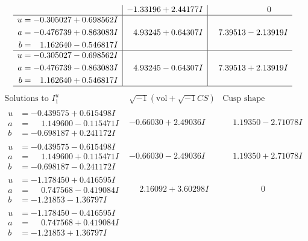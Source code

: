 \documentclass[1p]{elsarticle_modified}
\theoremstyle{definition}
\newcommand{\I}{\sqrt{-1}}
\begin{document}
$$\begin{array}{c|c|c}
 & -1.33196 + 2.44177 I & \phantom{-0.000000 } 0 \\ \hline\begin{aligned}
u &= -0.305027 + 0.698562 I \\
a &= -0.476739 + 0.863083 I \\
b &= \phantom{-}1.162640 - 0.546817 I\end{aligned}
 & \phantom{-}4.93245 + 0.64307 I & \phantom{-}7.39513 - 2.13919 I \\ \hline\begin{aligned}
u &= -0.305027 - 0.698562 I \\
a &= -0.476739 - 0.863083 I \\
b &= \phantom{-}1.162640 + 0.546817 I\end{aligned}
 & \phantom{-}4.93245 - 0.64307 I & \phantom{-}7.39513 + 2.13919 I\\
 \hline 
 \end{array}$$\newpage$$\begin{array}{c|c|c}  
\text{Solutions to }I^u_{1}& \I (\text{vol} + \sqrt{-1}CS) & \text{Cusp shape}\\
 \hline 
\begin{aligned}
u &= -0.439575 + 0.615498 I \\
a &= \phantom{-}1.149600 - 0.115471 I \\
b &= -0.698187 + 0.241172 I\end{aligned}
 & -0.66030 + 2.49036 I & \phantom{-}1.19350 - 2.71078 I \\ \hline\begin{aligned}
u &= -0.439575 - 0.615498 I \\
a &= \phantom{-}1.149600 + 0.115471 I \\
b &= -0.698187 - 0.241172 I\end{aligned}
 & -0.66030 - 2.49036 I & \phantom{-}1.19350 + 2.71078 I \\ \hline\begin{aligned}
u &= -1.178450 + 0.416595 I \\
a &= \phantom{-}0.747568 - 0.419084 I \\
b &= -1.21853 - 1.36797 I\end{aligned}
 & \phantom{-}2.16092 + 3.60298 I & \phantom{-0.000000 } 0 \\ \hline\begin{aligned}
u &= -1.178450 - 0.416595 I \\
a &= \phantom{-}0.747568 + 0.419084 I \\
b &= -1.21853 + 1.36797 I\end{aligned}

\end{array}$$
\end{document}

